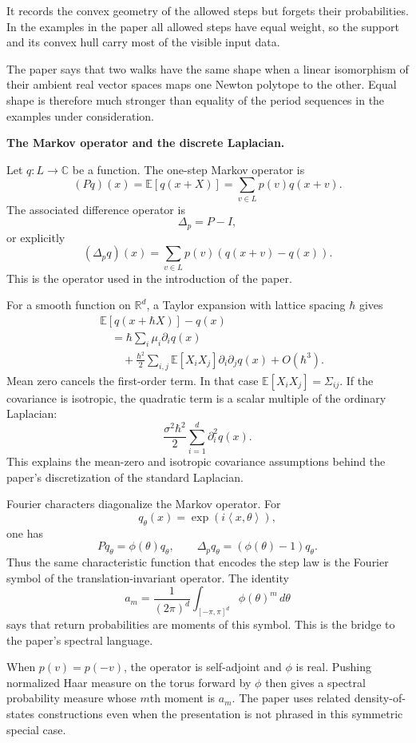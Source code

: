 It records the convex geometry of the
allowed steps but forgets their
probabilities. In the examples in the
paper all allowed steps have equal weight,
so the support and its convex hull carry
most of the visible input data.

The paper says that two walks have the
same shape when a linear isomorphism of
their ambient real vector spaces maps one
Newton polytope to the other. Equal shape
is therefore much stronger than equality
of the period sequences in the examples
under consideration.

\medskip\noindent
{\bf The Markov operator and the discrete
Laplacian.}

Let $q:L\to\mathbb C$ be a function. The
one-step Markov operator is
$$
(Pq)(x)
=\mathbb E[q(x+X)]
=\sum_{v\in L}p(v)q(x+v).
$$
The associated difference operator is
$$
\Delta_p=P-I,
$$
or explicitly
$$
(\Delta_p q)(x)
=\sum_{v\in L}p(v)
 (q(x+v)-q(x)).
$$
This is the operator used in the
introduction of the paper.

For a smooth function on $\mathbb R^d$, a
Taylor expansion with lattice spacing
$\hbar$ gives
$$
\begin{aligned}
&\mathbb E[q(x+\hbar X)]-q(x) \\
&\quad=\hbar\sum_i\mu_i\partial_iq(x) \\
&\qquad
+\frac{\hbar^2}{2}
 \sum_{i,j}\mathbb E[X_iX_j]
 \partial_i\partial_jq(x)
+O(\hbar^3).
\end{aligned}
$$
Mean zero cancels the first-order term. In
that case $\mathbb E[X_iX_j]=\Sigma_{ij}$.
If the covariance is isotropic, the
quadratic term is a scalar multiple of the
ordinary Laplacian:
$$
\frac{\sigma^2\hbar^2}{2}
\sum_{i=1}^d\partial_i^2q(x).
$$
This explains the mean-zero and isotropic
covariance assumptions behind the paper's
discretization of the standard Laplacian.

Fourier characters diagonalize the Markov
operator. For
$$
q_\theta(x)
=\exp(i\left\langle{}
 x,\theta\right\rangle{}),
$$
one has
$$
Pq_\theta=\phi(\theta)q_\theta,
\qquad
\Delta_pq_\theta
=(\phi(\theta)-1)q_\theta.
$$
Thus the same characteristic function that
encodes the step law is the Fourier symbol
of the translation-invariant operator.
The identity
$$
a_m
=\frac{1}{(2\pi)^d}
 \int_{[-\pi,\pi]^d}
 \phi(\theta)^m\,d\theta
$$
says that return probabilities are moments
of this symbol. This is the bridge to the
paper's spectral language.

When $p(v)=p(-v)$, the operator is
self-adjoint and $\phi$ is real. Pushing
normalized Haar measure on the torus
forward by $\phi$ then gives a spectral
probability measure whose $m$th moment is
$a_m$. The paper uses related
density-of-states constructions even when
the presentation is not phrased in this
symmetric special case.

